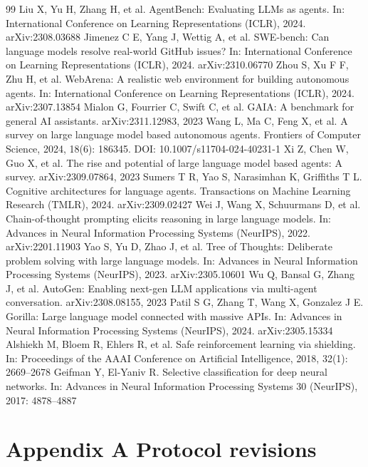 \documentclass[10pt]{article}
\begin{document}
\begin{thebibliography}{99}
 Liu X, Yu H, Zhang H, et al. AgentBench: Evaluating LLMs as agents. In: International Conference on Learning Representations (ICLR), 2024. arXiv:2308.03688
 Jimenez C E, Yang J, Wettig A, et al. SWE-bench: Can language models resolve real-world GitHub issues? In: International Conference on Learning Representations (ICLR), 2024. arXiv:2310.06770
 Zhou S, Xu F F, Zhu H, et al. WebArena: A realistic web environment for building autonomous agents. In: International Conference on Learning Representations (ICLR), 2024. arXiv:2307.13854
 Mialon G, Fourrier C, Swift C, et al. GAIA: A benchmark for general AI assistants. arXiv:2311.12983, 2023
 Wang L, Ma C, Feng X, et al. A survey on large language model based autonomous agents. Frontiers of Computer Science, 2024, 18(6): 186345. DOI: 10.1007/s11704-024-40231-1
 Xi Z, Chen W, Guo X, et al. The rise and potential of large language model based agents: A survey. arXiv:2309.07864, 2023
 Sumers T R, Yao S, Narasimhan K, Griffiths T L. Cognitive architectures for language agents. Transactions on Machine Learning Research (TMLR), 2024. arXiv:2309.02427
 Wei J, Wang X, Schuurmans D, et al. Chain-of-thought prompting elicits reasoning in large language models. In: Advances in Neural Information Processing Systems (NeurIPS), 2022. arXiv:2201.11903
 Yao S, Yu D, Zhao J, et al. Tree of Thoughts: Deliberate problem solving with large language models. In: Advances in Neural Information Processing Systems (NeurIPS), 2023. arXiv:2305.10601
 Wu Q, Bansal G, Zhang J, et al. AutoGen: Enabling next-gen LLM applications via multi-agent conversation. arXiv:2308.08155, 2023
 Patil S G, Zhang T, Wang X, Gonzalez J E. Gorilla: Large language model connected with massive APIs. In: Advances in Neural Information Processing Systems (NeurIPS), 2024. arXiv:2305.15334
 Alshiekh M, Bloem R, Ehlers R, et al. Safe reinforcement learning via shielding. In: Proceedings of the AAAI Conference on Artificial Intelligence, 2018, 32(1): 2669--2678
 Geifman Y, El-Yaniv R. Selective classification for deep neural networks. In: Advances in Neural Information Processing Systems 30 (NeurIPS), 2017: 4878--4887
\end{thebibliography}

\section*{Appendix A Protocol revisions}
\end{document}

